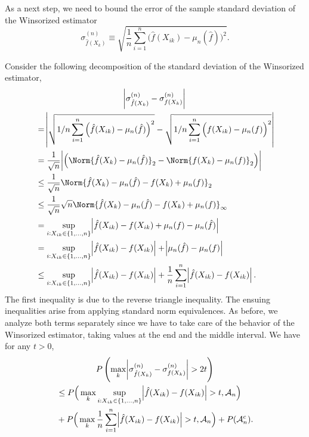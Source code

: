 \noindent As a next step, we need to bound the error of the sample standard deviation of the Winsorized estimator
\begin{equation*}
    \sigma^{(n)}_{\hat{f}(X_k)} \equiv \sqrt{\frac{1}{n}\sum_{i=1}^n \Big(\hat{f}(X_{ik}) - \mu_n(\hat{f})\Big)^2}.
\end{equation*}

Consider the following decomposition of the standard deviation of the Winsorized estimator,
\begin{multline*}
    \abs{\sigma^{(n)}_{\hat{f}(X_k)} - \sigma^{(n)}_{f(X_k)}} \\
    \begin{aligned}
         & = \abs{\sqrt{1/n\sum_{i=1}^n \Big(\hat{f}(X_{ik}) - \mu_n(\hat{f})\Big)^2} - \sqrt{1/n\sum_{i=1}^n \Big(f(X_{ik}) - \mu_n(f)\Big)^2}}   \\
         & = \frac{1}{\sqrt{n}}\abs{\Big( \Norm{\hat{f}(X_k) - \mu_n(\hat{f})}_2 - \Norm{f(X_k) - \mu_n(f)}_2 \Big)}                               \\
         & \leq \frac{1}{\sqrt{n}} \Norm{\hat{f}(X_k) - \mu_n(\hat{f}) - f(X_k) + \mu_n(f)}_2                                                      \\
         & \leq \frac{1}{\sqrt{n}} \sqrt{n}\Norm{\hat{f}(X_k) - \mu_n(\hat{f}) - f(X_k) + \mu_n(f)}_\infty                                         \\
         & = \sup_{i: X_{ik} \in \{1,\dots,n\}} \abs{\hat{f}(X_{ik}) - f(X_{ik}) + \mu_n(f) - \mu_n(\hat{f})}                                      \\
         & = \sup_{i: X_{ik} \in \{1,\dots,n\}} \abs{\hat{f}(X_{ik}) - f(X_{ik})} + \abs{\mu_n(\hat{f}) - \mu_n(f)}                                \\
         & \leq \sup_{i: X_{ik} \in \{1,\dots,n\}} \abs{\hat{f}(X_{ik}) - f(X_{ik})} + \frac{1}{n} \sum_{i=1}^n \abs{\hat{f}(X_{ik}) - f(X_{ik})}.
    \end{aligned}
\end{multline*}
The first inequality is due to the reverse triangle inequality. The ensuing inequalities arise from applying standard norm equivalences. As before, we analyze both terms separately since we have to take care of the behavior of the Winsorized estimator, taking values at the end and the middle interval. We have for any $t > 0$,
\begin{multline*}
    P\left(\max_k \abs{\sigma^{(n)}_{\hat{f}(X_k)} - \sigma^{(n)}_{f(X_k)}} > 2t \right) \\
    \begin{aligned}
         & \leq P\Big(\max_k \sup_{i: X_{ik} \in \{1,\dots,n\}} \abs{\hat{f}(X_{ik}) - f(X_{ik})} > t, \mathcal{A}_n\Big)          \\
         & + P\Big(\max_k \frac{1}{n} \sum_{i=1}^n \abs{\hat{f}(X_{ik}) - f(X_{ik})} > t, \mathcal{A}_n\Big) + P(\mathcal{A}_n^c).
    \end{aligned}
\end{multline*}
